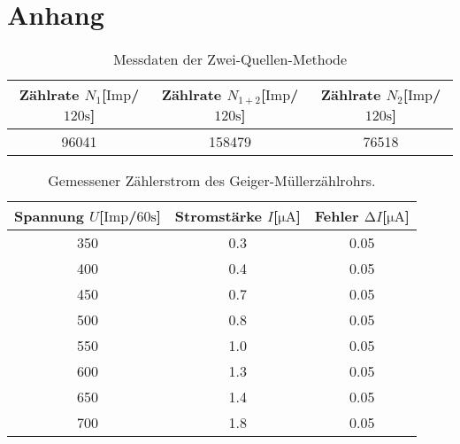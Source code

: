 \section{Anhang}

\begin{table}
\centering
\caption{Messdaten der Zwei-Quellen-Methode}
\label{tab:ogemessdaten3}
\begin{tabular}{c c c}
    \toprule
    Zählrate $N_{1}$[$\text{Imp}$/$120\si{\second}$] & Zählrate $N_{1+2}$[$\text{Imp}$/$120\si{\second}$] & Zählrate $N_{2}$[$\text{Imp}$/$120\si{\second}$]\\
    \midrule
    96041 & 158479 & 76518 \\
    \bottomrule
\end{tabular}
\end{table}

\begin{table}
\centering
\caption{Gemessener Zählerstrom des Geiger-Müllerzählrohrs.}
\label{tab:ogemessdaten2}
\begin{tabular}{c c c}
    \toprule
    Spannung $U$[$\text{Imp}$/$60\si{\second}$] & Stromstärke $I$[$\si{\micro\ampere}$] & Fehler $\increment I$[$\si{\micro\ampere}$]\\
    \midrule
    350   & 0.3 & 0.05\\
    400	  & 0.4 & 0.05\\
    450	  & 0.7 & 0.05\\
    500	  & 0.8 & 0.05\\
    550	  & 1.0 & 0.05\\
    600	  & 1.3 & 0.05\\
    650	  & 1.4 & 0.05\\
    700	  & 1.8 & 0.05\\
    \bottomrule
\end{tabular}
\end{table}

